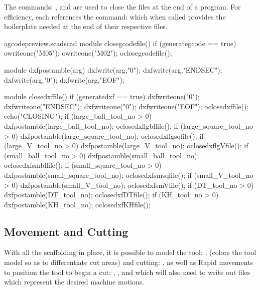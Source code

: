 \documentclass{ltxdoc}
\begin{document}
The commands: 
, and
are used to close the files at the end of a program. For efficiency, each references the command:
which when called provides the boilerplate needed at the end of their respective files.

\lstset{firstnumber=\thegcpscad}
\begin{writecode}{a}{gcodepreview.scad}{scad}
module closegcodefile() {
  if (generategcode == true) {
    owriteone("M05");
    owriteone("M02");
    oclosegcodefile();
  }
}

module dxfpostamble(arg) {
    dxfwrite(arg,"0");
    dxfwrite(arg,"ENDSEC");
    dxfwrite(arg,"0");
    dxfwrite(arg,"EOF");
}

module closedxffile() {
  if (generatedxf == true) {
    dxfwriteone("0");
    dxfwriteone("ENDSEC");
    dxfwriteone("0");
    dxfwriteone("EOF");
    oclosedxffile();
    echo("CLOSING");
    if (large_ball_tool_no >  0) {    dxfpostamble(large_ball_tool_no);
      oclosedxflgblfile();
    } 
    if (large_square_tool_no >  0) {    dxfpostamble(large_square_tool_no);
      oclosedxflgsqfile();
    } 
    if (large_V_tool_no >  0) {    dxfpostamble(large_V_tool_no);
      oclosedxflgVfile();
    } 
    if (small_ball_tool_no >  0) {    dxfpostamble(small_ball_tool_no);
      oclosedxfsmblfile();
    } 
    if (small_square_tool_no >  0) {    dxfpostamble(small_square_tool_no);
      oclosedxfsmsqfile();
    } 
    if (small_V_tool_no >  0) {    dxfpostamble(small_V_tool_no);
      oclosedxfsmVfile();
    } 
    if (DT_tool_no >  0) {    dxfpostamble(DT_tool_no);
      oclosedxfDTfile();
    } 
    if (KH_tool_no >  0) {    dxfpostamble(KH_tool_no);
      oclosedxfKHfile();
    } 
  }
}

\end{writecode}
\addtocounter{gcpscad}{50}

%
 
\subsection{Movement and Cutting}

With all the scaffolding in place, it is possible to model the tool: 
, (colors the tool model so as to differentiate cut areas)
and cutting: 
, 
as well as Rapid movements to position the tool to begin a cut:
, , and 
which will also need to write out files which represent the desired machine motions.
 
\end{document}
